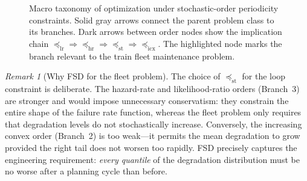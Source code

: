 \documentclass[11pt,a4paper]{article}
\theoremstyle{plain}
\theoremstyle{definition}
\theoremstyle{remark}
\newtheorem{remark}[theorem]{Remark}
\begin{document}
\begin{figure}[htbp]
\caption{Macro taxonomy of optimization under stochastic-order
periodicity constraints.  Solid gray arrows connect the parent problem
class to its branches.  Dark arrows between order nodes show the
implication chain $\preceq_{\mathrm{lr}} \Rightarrow
\preceq_{\mathrm{hr}} \Rightarrow \preceq_{\mathrm{st}} \Rightarrow
\preceq_{\mathrm{icx}}$.  The highlighted node marks the branch
relevant to the train fleet maintenance problem.}
\label{fig:macro_taxonomy}
\end{figure}

\begin{remark}[Why FSD for the fleet problem]
\label{rem:why_fsd}
The choice of $\preceq_{\mathrm{st}}$ for the loop constraint is
deliberate.  The hazard-rate and likelihood-ratio orders
(Branch~3) are stronger and would impose unnecessary conservatism:
they constrain the entire shape of the failure rate function,
whereas the fleet problem only requires that degradation levels
do not stochastically increase.  Conversely, the increasing convex
order (Branch~2) is too weak---it permits the mean degradation to
grow provided the right tail does not worsen too rapidly.  FSD
precisely captures the engineering requirement: \emph{every quantile}
of the degradation distribution must be no worse after a planning
cycle than before.
\end{remark}
\end{document}
